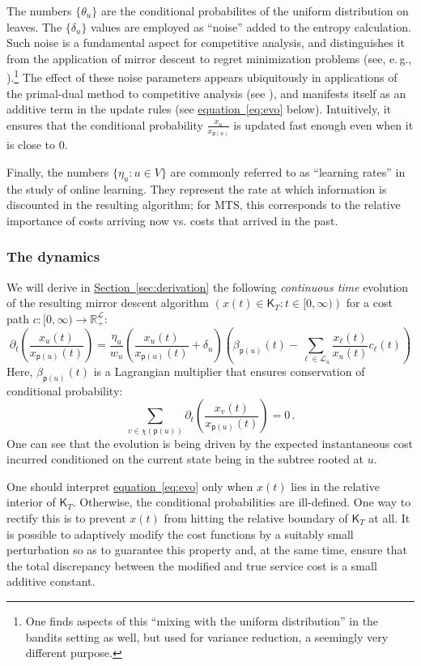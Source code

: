 \documentclass[11pt]{article}
\numberwithin{equation}{section}
\theoremstyle{definition}
\theoremstyle{plain}
\newcommand{\R}{\mathbb R}
\newcommand{\eg}{e.\,g.}
\newcommand{\expref}[2]{\hyperref[#2]{#1~\ref{#2}}}
\newcommand{\expeqref}[2]{\hyperref[#2]{#1~\eqref{#2}}}
\newcommand{\calL}{\mathcal L}
\newcommand{\sfp}{\mathsf{p}}
\newcommand{\sfK}{\mathsf K}
\begin{document}
The numbers $\{\theta_u\}$ are the conditional probabilites of the uniform distribution on leaves.
The $\{\delta_u\}$ values
are employed as ``noise'' added to the entropy calculation.
Such noise is a fundamental aspect for competitive analysis, and distinguishes it from the application
of mirror descent to regret minimization problems (see, \eg, \cite{BN12}).\footnote{One finds aspects of this ``mixing with the uniform distribution''
	in the bandits setting as well, but used for variance reduction, a seemingly very different purpose.}
The effect of these noise parameters appears ubiquitously in applications of the primal-dual method to competitive analysis (see \cite{BN07}),
and manifests itself as an additive term in the update rules (see \expeqref{equation}{eq:evo} below). Intuitively, it ensures that the conditional probability $\frac{x_u}{x_{\sfp(u)}}$ is updated fast enough even when it is close to $0$.

Finally, the numbers $\{\eta_u : u \in V\}$ are commonly referred to as ``learning rates'' in 
the study of online learning.  They represent the rate at which information is discounted in the resulting algorithm;
for MTS, this corresponds to the relative importance of costs arriving now vs. costs that arrived in the past.

\subsubsection{The dynamics}
\label{sec:dyn}

We will derive in \expref{Section}{sec:derivation} the following \emph{continuous time} evolution of the resulting mirror descent algorithm $\left(x(t) \in \sfK_T : t \in [0,\infty)\right)$ for a cost path $c\colon[0,\infty)\to \R_+^{\calL}$:
\begin{equation}\label{eq:evo}
\partial_t \left(\frac{x_u(t)}{x_{\sfp(u)}(t)}\right) = \frac{\eta_u}{w_u} \left(\frac{x_u(t)}{x_{\sfp(u)}(t)}+\delta_u\right)
\left(\beta_{\sfp(u)}(t) - \sum_{\ell \in \calL_u} \frac{x_{\ell}(t)}{x_u(t)} c_{\ell}(t)\right)
\end{equation}
Here, $\beta_{\sfp(u)}(t)$ is a Lagrangian multiplier that ensures conservation of conditional probability:
\[
\sum_{v \in \chi(\sfp(u))} \partial_t \left(\frac{x_v(t)}{x_{\sfp(u)}(t)}\right) = 0\,.
\]
One can see that the evolution is being driven by the expected instantaneous
cost incurred conditioned on the current state being in the subtree rooted at $u$.

One should interpret \expeqref{equation}{eq:evo} only when $x(t)$ lies in the relative interior of $\sfK_T$. Otherwise,
the conditional probabilities are ill-defined.
One way to rectify this is to
prevent $x(t)$ from hitting the relative boundary of $\sfK_T$ at all.
It is possible to adaptively modify the cost functions by a suitably small perturbation so as to guarantee
this property and, at the same time, ensure that the total discrepancy between
the modified and true service cost
is a small additive constant.
\end{document}
